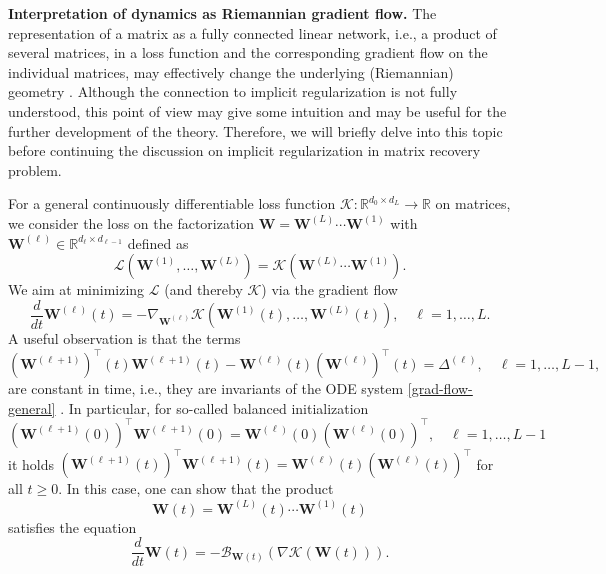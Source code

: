 \documentclass{svproc}
\newcommand{\bW}{\boldsymbol{W}}
\newcommand{\0}{\boldsymbol{0}}
\newcommand{\1}{\boldsymbol{1}}
\def\R{\mathbb{R}}
\begin{document}
\medskip

{\textbf{Interpretation of dynamics as Riemannian gradient flow.}}
The representation of a matrix as a fully connected linear network, i.e., a product of several matrices, in a loss function and the corresponding gradient flow on the individual matrices, may effectively change the underlying (Riemannian) geometry \cite{Bah2021learning}. Although the connection to implicit regularization is not fully understood, this point of view may give some intuition and may be useful for the further development of the theory. Therefore, we will briefly delve into this topic before continuing the discussion on implicit regularization in matrix recovery problem.

For a general continuously differentiable loss function  $\mathcal{K} : \R^{d_0 \times d_L} \to \R$ on matrices, we consider
the loss on the factorization $\bW = \bW^{(L)} \cdots \bW^{(1)}$ with $\bW^{(\ell)} \in \R^{d_\ell \times d_{\ell-1}}$ defined as
\[
\mathcal{L}(\bW^{(1)}, \hdots, \bW^{(L)}) = \mathcal{K}(\bW^{(L)} \cdots \bW^{(1)}).
\]
We aim at minimizing $\mathcal{L}$ (and thereby $\mathcal{K}$) via the gradient flow
\begin{equation}\label{grad-flow-general}
\frac{d}{dt} \bW^{(\ell)}(t) = - \nabla_{\bW^{(\ell)}} \mathcal{K}(\bW^{(1)}(t),\hdots,\bW^{(L)}(t)), \quad \ell=1,\hdots,L.
\end{equation}
A useful observation is that the terms
\[
(\bW^{(\ell+1)})^\top(t)\bW^{(\ell+1)}(t) - \bW^{(\ell)}(t)(\bW^{(\ell)})^\top(t) = \Delta^{(\ell)}, \quad \ell=1,\hdots, L-1,
\]
are constant in time, i.e., they are invariants of the ODE system \eqref{grad-flow-general} \cite{Bah2021learning,arcoha18,arora2018convergence,chlico23}. In particular, for so-called balanced initialization
\begin{equation}\label{balancedness}
(\bW^{(\ell+1)}(0))^\top\bW^{(\ell+1)}(0) = \bW^{(\ell)}(0)(\bW^{(\ell)}(0))^\top, \quad \ell=1,\hdots,L-1
\end{equation}
it holds $(\bW^{(\ell+1)}(t))^\top \bW^{(\ell+1)}(t) = \bW^{(\ell)}(t)(\bW^{(\ell)}(t))^\top$ for all $t \geq 0$.
In this case, one can show \cite{arcoha18,Bah2021learning} that the product
\begin{equation}\label{prod-flow}
\bW(t) = \bW^{(L)}(t) \cdots \bW^{(1)}(t)
\end{equation}
satisfies the equation
\begin{equation}\label{flow-product}
\frac{d}{dt} \bW(t) = - \mathcal{B}_{\bW(t)}(\nabla \mathcal{K}(\bW(t))).
\end{equation}
\end{document}
